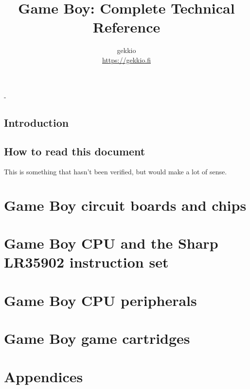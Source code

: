 \documentclass[a4paper, draft, oneside]{memoir}
\title{Game Boy: Complete Technical Reference}
\author{gekkio\\ \url{https://gekkio.fi}}
\begin{document}
\hypersetup{pageanchor=false}

\begin{titlingpage}
  \calccentering{\unitlength}
  \setlength{\droptitle}{80pt}
  \begin{adjustwidth*}{\unitlength}{-\unitlength}
    \maketitle
  \end{adjustwidth*}
\end{titlingpage}

\hypersetup{pageanchor=true}

\tableofcontents

\chapter*{Introduction}

\chapter*{How to read this document}

\begin{speculation}
  This is something that hasn't been verified, but would make a lot of sense.
\end{speculation}

\part{Game Boy circuit boards and chips}


\part{Game Boy CPU and the Sharp LR35902 instruction set}

\part{Game Boy CPU peripherals}

\part{Game Boy game cartridges}

\part*{Appendices}

\begin{appendices}


\end{appendices}


\end{document}
